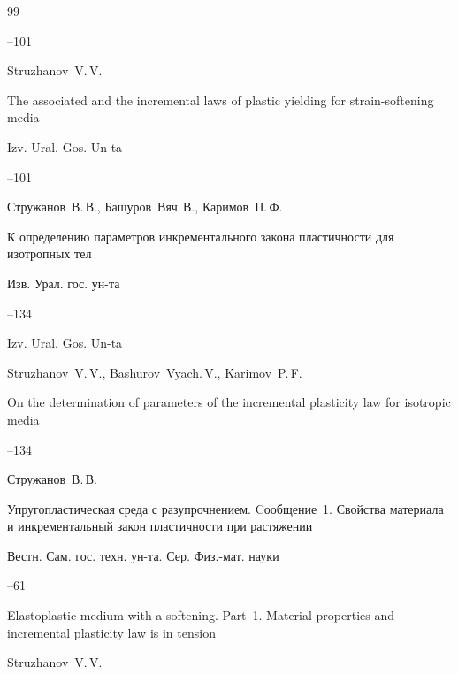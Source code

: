 \begin{thebibliography}{99}

--101

\misctransl

\by Struzhanov~V.\,V.

\paper The associated and the incremental laws of plastic yielding for strain-softening media

\jour Izv. Ural. Gos. Un-ta



--101






\by Стружанов~В.\,В., Башуров~Вяч.\,В., Каримов~П.\,Ф.

\paper К определению параметров инкрементального закона пластичности для изотропных тел

\jour Изв. Урал. гос. ун-та



--134

\misctransl

\jour Izv. Ural. Gos. Un-ta

\by Struzhanov~V.\,V., Bashurov~Vyach.\,V., Karimov~P.\,F.

\paper On the determination of parameters of the incremental plasticity law for isotropic media



--134






\by Стружанов~В.\,В.

\paper Упругопластическая среда с разупрочнением. Cообщение~1. Свойства материала и инкрементальный закон пластичности при растяжении

\jour  Вестн. Сам. гос. техн. ун-та. Сер. Физ.-мат. науки



--61

\misctransl

\paper Elastoplastic medium with a softening. Part~1. Material properties and incremental plasticity law is in tension

\by Struzhanov~V.\,V.


\end{thebibliography}
